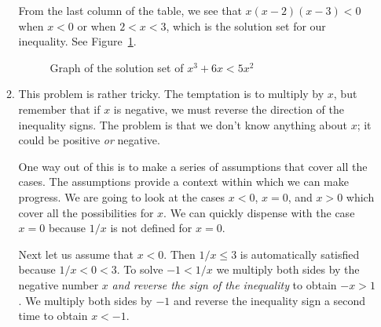 \documentclass{article}
\begin{document}
\begin{enumerate}
\begin{enumerate}
\begin{table}[htbp]
      \label{tab:xpx-2ppx-3p}
    \end{table}
    From the last column of the table, we see that $x(x-2)(x-3)<0$
    when $x<0$ or when $2<x<3$, which is the solution set for our
    inequality.  See Figure~\ref{fig:x3+6xLT5x2}.
    \begin{figure}[htbp]
      \centering
      \caption{Graph of the solution set of $x^3+6x<5x^2$}
      \label{fig:x3+6xLT5x2}
    \end{figure}
  \item %
    This problem is rather tricky.  The temptation is to multiply by
    $x$, but remember that if
    $x$ is negative, we must reverse the direction of the inequality
    signs.  The problem is that we don't know anything about
    $x$; it could be positive \textit{or} negative.

    One way out of this is to make a series of assumptions that cover
    all the cases.  The assumptions provide a context within which we
    can make progress.  We are going to look at the cases
    $x<0$, $x=0$, and $x>0$ which cover all the possibilities for
    $x$.  We can quickly dispense with the case $x=0$ because
    $1/x$ is not defined for $x=0$.

    Next let us assume that $x<0$.  Then $1/x\le 3$ is automatically
    satisfied because $1/x < 0 < 3$.  To solve $-1<1/x$ we multiply
    both sides by the negative number $x$ \textit{and reverse the sign
      of the inequality} to obtain $-x>1$.  We multiply both sides by
    $-1$ and reverse the inequality sign a second time to obtain
    $x<-1$.


\end{enumerate}
\end{enumerate}
\end{document}
